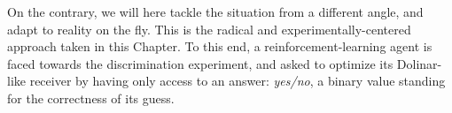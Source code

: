 On the contrary, we will here tackle the situation from a different angle, and adapt to reality on the fly. This is the radical and experimentally-centered approach taken in this Chapter. To this end, a reinforcement-learning agent is faced towards the discrimination experiment, and asked to optimize its Dolinar-like receiver by having only access to an answer: \textit{yes/no}, a binary value standing for the correctness of its guess.
